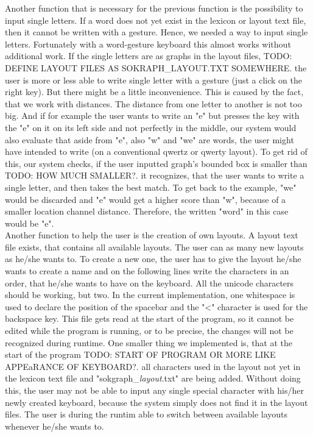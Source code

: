 Another function that is necessary for the previous function is the possibility to input single letters. If a word does not yet exist in the lexicon or layout text file, then it cannot be written with a gesture. Hence, we needed a way to input single letters. Fortunately with a word-gesture keyboard this almost works without additional work. If the single letters are as graphs in the layout files, TODO: DEFINE LAYOUT FILES AS SOKRAPH\_LAYOUT.TXT SOMEWHERE. the user is more or less able to write single letter with a gesture (just a click on the right key). But there might be a little inconvenience. This is caused by the fact, that we work with distances. The distance from one letter to another is not too big. And if for example the user wants to write an "e" but presses the key with the "e" on it on its left side and not perfectly in the middle, our system would also evaluate that aside from "e", also "w" and "we" are words, the user might have intended to write (on a conventional qwertz or qwerty layout). To get rid of this, our system checks, if the user inputted graph's bounded box is smaller than TODO: HOW MUCH SMALLER?. it recognizes, that the user wants to write a single letter, and then takes the best match. To get back to the example, "we" would be discarded and "e" would get a higher score than "w", because of a smaller location channel distance. Therefore, the written "word" in this case would be "e".\\
Another function to help the user is the creation of own layouts. A layout text file exists, that contains all available layouts. The user can as many new layouts as he/she wants to. To create a new one, the user has to give the layout he/she wants to create a name and on the following lines write the characters in an order, that he/she wants to have on the keyboard. All the unicode characters should be working, but two. In the current implementation, one whitespace is used to declare the position of the spacebar and the "<" character is used for the backspace key. This file gets read at the start of the program, so it cannot be edited while the program is running, or to be precise, the changes will not be recognized during runtime. One smaller thing we implemented is, that at the start of the program TODO: START OF PROGRAM OR MORE LIKE APPEaRANCE OF KEYBOARD?. all characters used in the layout not yet in the lexicon text file and "sokgraph\_\textit{layout}.txt" are being added. Without doing this, the user may not be able to input any single special character with his/her newly created keyboard, because the system simply does not find it in the layout files. The user is during the runtim able to switch between available layouts whenever he/she wants to.\\
